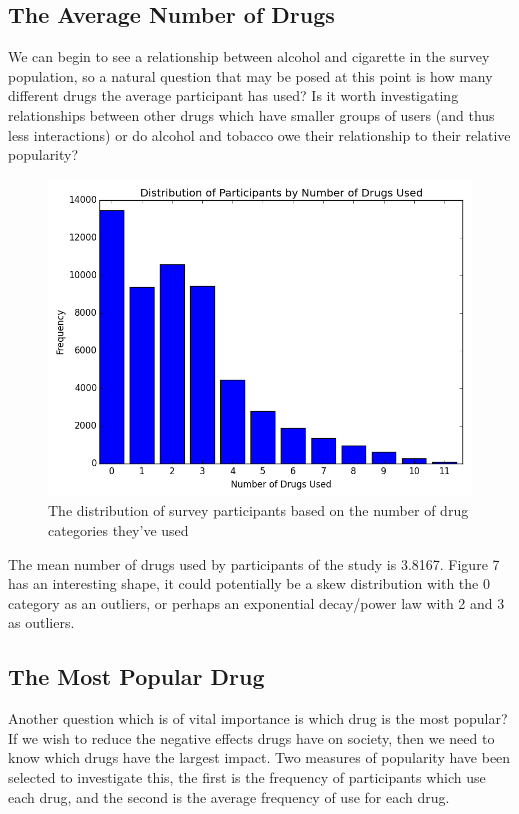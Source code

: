 \documentclass[a4 paper]{article}
\begin{document}
\subsection*{The Average Number of Drugs}
We can begin to see a relationship between alcohol and cigarette in the survey population, so a natural question that may be posed at this point is how many different drugs the average participant has used? Is it worth investigating relationships between other drugs which have smaller groups of users (and thus less interactions) or do alcohol and tobacco owe their relationship to their relative popularity?

\begin{figure}[H]
	\centering
	\includegraphics[width=5in]{images/numDrugsUsedDist}
	\caption{The distribution of survey participants based on the number of drug categories they've used}
\end{figure}

The mean number of drugs used by participants of the study is 3.8167. Figure 7 has an interesting shape, it could potentially be a skew distribution with the 0 category as an outliers, or perhaps an exponential decay/power law with 2 and 3 as outliers.\\


\subsection*{The Most Popular Drug}
Another question which is of vital importance is which drug is the most popular? If we wish to reduce the negative effects drugs have on society, then we need to know which drugs have the largest impact. Two measures of popularity have been selected to investigate this, the first is the frequency of participants which use each drug, and the second is the average frequency of use for each drug.
\end{document}

